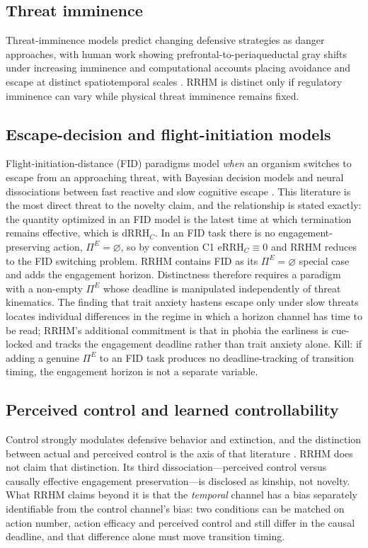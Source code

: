 \documentclass[9pt,twocolumn]{article}
\newcommand{\eRRHc}{\mathrm{eRRH}_{C}}
\newcommand{\dRRHc}{\mathrm{dRRH}_{C}}
\begin{document}
\subsection{Threat imminence}
Threat-imminence models predict changing defensive strategies as danger approaches, with human work showing prefrontal-to-periaqueductal gray shifts under increasing imminence and computational accounts placing avoidance and escape at distinct spatiotemporal scales \cite{mobbs2007,mobbs2020}. RRHM is distinct only if regulatory imminence can vary while physical threat imminence remains fixed.

\subsection{Escape-decision and flight-initiation models}
\label{sec:fid}
Flight-initiation-distance (FID) paradigms model \emph{when} an organism switches to escape from an approaching threat, with Bayesian decision models and neural dissociations between fast reactive and slow cognitive escape \cite{qi2018,fung2019}. This literature is the most direct threat to the novelty claim, and the relationship is stated exactly: the quantity optimized in an FID model is the latest time at which termination remains effective, which is $\dRRHc$. In an FID task there is no engagement-preserving action, $\Pi^E=\varnothing$, so by convention C1 $\eRRHc\equiv0$ and RRHM reduces to the FID switching problem. RRHM contains FID as its $\Pi^E=\varnothing$ special case and adds the engagement horizon. Distinctness therefore requires a paradigm with a non-empty $\Pi^E$ whose deadline is manipulated independently of threat kinematics. The finding that trait anxiety hastens escape only under slow threats \cite{fung2019} locates individual differences in the regime in which a horizon channel has time to be read; RRHM's additional commitment is that in phobia the earliness is cue-locked and tracks the engagement deadline rather than trait anxiety alone. Kill: if adding a genuine $\Pi^E$ to an FID task produces no deadline-tracking of transition timing, the engagement horizon is not a separate variable.

\subsection{Perceived control and learned controllability}
Control strongly modulates defensive behavior and extinction, and the distinction between actual and perceived control is the axis of that literature \cite{maier2016,hartley2014,wood2015}. RRHM does not claim that distinction. Its third dissociation---perceived control versus causally effective engagement preservation---is disclosed as kinship, not novelty. What RRHM claims beyond it is that the \emph{temporal} channel has a bias separately identifiable from the control channel's bias: two conditions can be matched on action number, action efficacy and perceived control and still differ in the causal deadline, and that difference alone must move transition timing.
\end{document}
